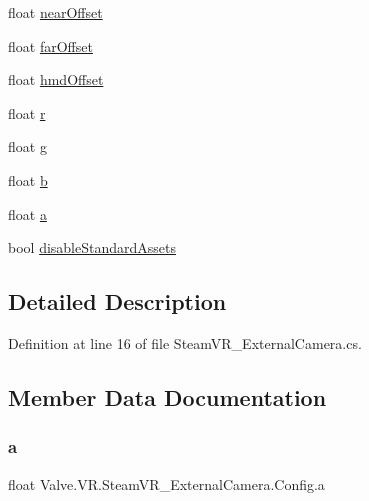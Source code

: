 \begin{DoxyCompactItemize}
\item 
float \mbox{\hyperlink{struct_valve_1_1_v_r_1_1_steam_v_r___external_camera_1_1_config_a66d86e0e0d558d706e4481737ede2ff5}{near\+Offset}}
\item 
float \mbox{\hyperlink{struct_valve_1_1_v_r_1_1_steam_v_r___external_camera_1_1_config_a777818ee013b99ff19d66b88fffc9dea}{far\+Offset}}
\item 
float \mbox{\hyperlink{struct_valve_1_1_v_r_1_1_steam_v_r___external_camera_1_1_config_a6475934035c4e9bf74330afe073bd1dc}{hmd\+Offset}}
\item 
float \mbox{\hyperlink{struct_valve_1_1_v_r_1_1_steam_v_r___external_camera_1_1_config_af2e8cef23f1b288a006f2551aa8b76d0}{r}}
\item 
float \mbox{\hyperlink{struct_valve_1_1_v_r_1_1_steam_v_r___external_camera_1_1_config_ac33745ba2195152a1fb45114b8166a2c}{g}}
\item 
float \mbox{\hyperlink{struct_valve_1_1_v_r_1_1_steam_v_r___external_camera_1_1_config_a61fefd6bd3ec6534de9ec4700e1d459e}{b}}
\item 
float \mbox{\hyperlink{struct_valve_1_1_v_r_1_1_steam_v_r___external_camera_1_1_config_a950cc225ae05b061f77d070ef10dd620}{a}}
\item 
bool \mbox{\hyperlink{struct_valve_1_1_v_r_1_1_steam_v_r___external_camera_1_1_config_a545c6082b0d973c978acca315a2bfd0f}{disable\+Standard\+Assets}}
\end{DoxyCompactItemize}


\subsection{Detailed Description}


Definition at line 16 of file Steam\+V\+R\+\_\+\+External\+Camera.\+cs.



\subsection{Member Data Documentation}
\mbox{\label{struct_valve_1_1_v_r_1_1_steam_v_r___external_camera_1_1_config_a950cc225ae05b061f77d070ef10dd620}} 
\subsubsection{\texorpdfstring{a}{a}}
{\footnotesize\ttfamily float Valve.\+V\+R.\+Steam\+V\+R\+\_\+\+External\+Camera.\+Config.\+a}



